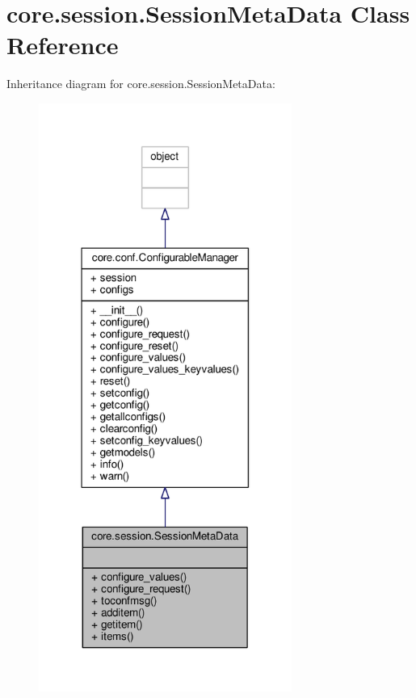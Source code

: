 \hypertarget{classcore_1_1session_1_1_session_meta_data}{\section{core.\+session.\+Session\+Meta\+Data Class Reference}
\label{classcore_1_1session_1_1_session_meta_data}
}


Inheritance diagram for core.\+session.\+Session\+Meta\+Data\+:
\nopagebreak
\begin{figure}[H]
\begin{center}
\leavevmode
\includegraphics[width=235pt]{classcore_1_1session_1_1_session_meta_data__inherit__graph}
\end{center}
\end{figure}


